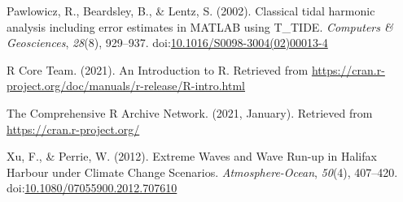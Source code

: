 \documentclass[10pt,a4paper,onecolumn]{article}
\newlength{\cslhangindent}
\newenvironment{CSLReferences}[3] %
 {%
  \setlength{\parindent}{0pt}
  \ifodd #1 \everypar{\setlength{\hangindent}{\cslhangindent}}\ignorespaces\fi
  \ifnum #2 > 0
  \setlength{\parskip}{#2\baselineskip}
  \fi
 }%
 {}
\begin{document}
\begin{CSLReferences}{1}{0}
\leavevmode{}%
Pawlowicz, R., Beardsley, B., \& Lentz, S. (2002). Classical tidal
harmonic analysis including error estimates in {MATLAB} using {T}\_TIDE.
\emph{Computers \& Geosciences}, \emph{28}(8), 929--937.
doi:\href{https://doi.org/10.1016/S0098-3004(02)00013-4}{10.1016/S0098-3004(02)00013-4}

\leavevmode{}%
R Core Team. (2021). An {Introduction} to {R}. Retrieved from
\url{https://cran.r-project.org/doc/manuals/r-release/R-intro.html}

\leavevmode{}%
The {Comprehensive} {R} {Archive} {Network}. (2021, January). Retrieved
from \url{https://cran.r-project.org/}

\leavevmode{}%
Xu, F., \& Perrie, W. (2012). Extreme {Waves} and {Wave} {Run}-up in
{Halifax} {Harbour} under {Climate} {Change} {Scenarios}.
\emph{Atmosphere-Ocean}, \emph{50}(4), 407--420.
doi:\href{https://doi.org/10.1080/07055900.2012.707610}{10.1080/07055900.2012.707610}

\end{CSLReferences}
\end{document}
